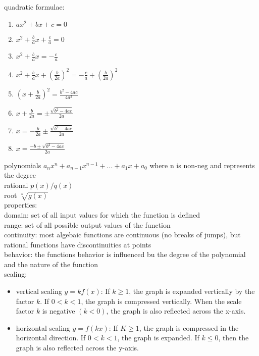 \documentclass{article}
\begin{document}
quadratic formulae:

	\begin{enumerate}
		\item $ax^2 + bx + c = 0$
		\item $x^2 + \frac{b}{a}x + \frac{c}{a} = 0$
		\item $x^2 + \frac{b}{a}x = -\frac{c}{a}$
		\item $x^2 + \frac{b}{a}x + \left( \frac{b}{2a} \right)^2 = -\frac{c}{a} + \left( \frac{b}{2a} \right)^2$
		\item $\left( x + \frac{b}{2a} \right)^2 = \frac{b^2 - 4ac}{4a^2}$
		\item $x + \frac{b}{2a} = \pm \frac{\sqrt{b^2 - 4ac}}{2a}$
		\item $x = -\frac{b}{2a} \pm \frac{\sqrt{b^2 - 4ac}}{2a}$
		\item $x = \frac{-b \pm \sqrt{b^2 - 4ac}}{2a}$
	\end{enumerate}

polynomials $a_nx^n + a_{n-1}x^{n-1} + ... + a_1x + a_0$ where n is non-neg and represents the degree\\

rational $p(x)/q(x)$\\

root $\sqrt[n]{g(x)}$\\

properties:\\
	domain: set of all input values for which the function is defined\\
	range: set of all possible output values of the function\\
	
	continuity: most algebaic functions are continuous (no breaks of jumps), but rational functions have discontinuities at points\\
		
	behavior: the functions behavior is influenced bu the degree of the polynomial and the nature of the function\\


	scaling:\\
		\begin{itemize}
			\item{vertical scaling} $y = kf(x)$: If $k \geq 1$, the graph is expanded vertically by the factor $k$. If $0 < k < 1$, the graph is compressed vertically. When the scale factor $k$ is negative $(k < 0)$, the graph is also reflected across the x-axis.
			\item{horizontal scaling} $y = f(kx)$: If $K \geq 1$, the graph is compressed in the horizontal direction. If $0 < k < 1$, the graph is expanded. If $k \leq 0$, then the graph is also reflected across the y-axis.
		\end{itemize}
\end{document}
